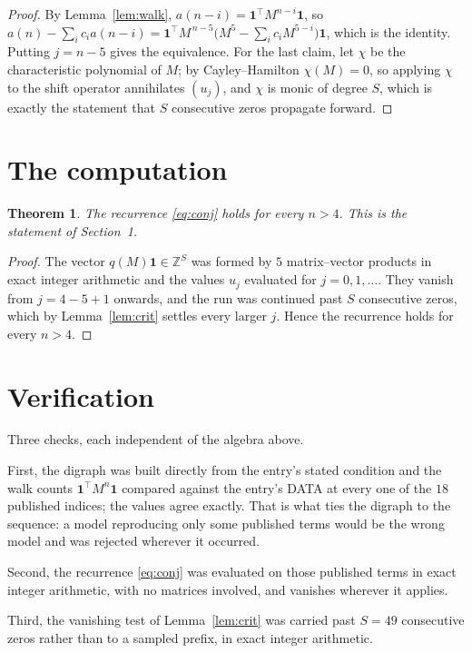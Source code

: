 \documentclass[11pt,a4paper]{article}
\theoremstyle{plain}
\newtheorem{theorem}{Theorem}
\theoremstyle{definition}
\begin{document}
\begin{proof}
By Lemma~\ref{lem:walk}, $a(n-i)=\mathbf{1}^{\!\top}M^{n-i}\mathbf{1}$, so
$a(n)-\sum_i c_i a(n-i)
=\mathbf{1}^{\!\top}M^{\,n-5}\bigl(M^{5}-\sum_i c_i M^{5-i}\bigr)
\mathbf{1}$, which is the identity. Putting $j=n-5$ gives the equivalence. For the
last claim, let $\chi$ be the characteristic polynomial of $M$; by Cayley--Hamilton
$\chi(M)=0$, so applying $\chi$ to the shift operator annihilates $(u_j)$, and $\chi$ is
monic of degree $S$, which is exactly the statement that $S$ consecutive zeros propagate
forward.
\end{proof}

\section{The computation}

\begin{theorem}
The recurrence \eqref{eq:conj} holds for every $n>4$. This is the statement of
Section~1.
\end{theorem}

\begin{proof}
The vector $q(M)\mathbf{1}\in\mathbb{Z}^{S}$ was formed by $5$ matrix--vector
products in exact integer arithmetic and the values $u_j$ evaluated for
$j=0,1,\dots$. They vanish from $j=4-5+1$ onwards, and the run was continued past
$S$ consecutive zeros, which by Lemma~\ref{lem:crit} settles every larger $j$. Hence the
recurrence holds for every $n>4$.
\end{proof}

\section{Verification}

Three checks, each independent of the algebra above.

First, the digraph was built directly from the entry's stated condition and the walk counts
$\mathbf{1}^{\!\top}M^{n}\mathbf{1}$ compared against the entry's DATA at every one of
the $18$ published indices; the values agree exactly. That is what ties the digraph to
the sequence: a model reproducing only some published terms would be the wrong model and
was rejected wherever it occurred.

Second, the recurrence \eqref{eq:conj} was evaluated on those published terms in exact
integer arithmetic, with no matrices involved, and vanishes wherever it applies.

Third, the vanishing test of Lemma~\ref{lem:crit} was carried past $S=49$ consecutive
zeros rather than to a sampled prefix, in exact integer arithmetic.
\end{document}
